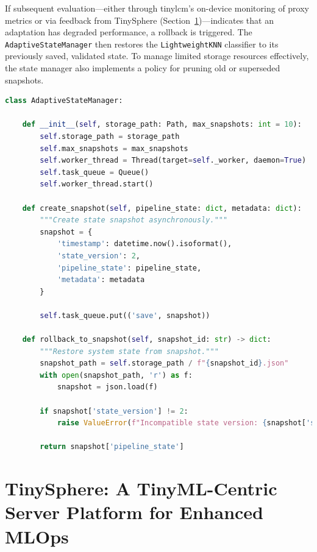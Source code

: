 If subsequent evaluation—either through \gls{tinylcm}'s on-device monitoring of proxy metrics or via feedback from TinySphere (Section~\ref{sec:tinysphere_detailed_design})—indicates that an adaptation has degraded performance, a rollback is triggered. The \texttt{AdaptiveStateManager} then restores the \texttt{LightweightKNN} classifier to its previously saved, validated state. To manage limited storage resources effectively, the state manager also implements a policy for pruning old or superseded snapshots.

\begin{lstlisting}[captionpos=b, language=Python, commentstyle=\color{blue}\itshape, caption={\texttt{AdaptiveStateManager} Implementation Highlights}, label=lst:statemanager]
class AdaptiveStateManager:
    
    def __init__(self, storage_path: Path, max_snapshots: int = 10):
        self.storage_path = storage_path
        self.max_snapshots = max_snapshots
        self.worker_thread = Thread(target=self._worker, daemon=True)
        self.task_queue = Queue()
        self.worker_thread.start()
        
    def create_snapshot(self, pipeline_state: dict, metadata: dict):
        """Create state snapshot asynchronously."""
        snapshot = {
            'timestamp': datetime.now().isoformat(),
            'state_version': 2,
            'pipeline_state': pipeline_state,
            'metadata': metadata
        }
        
        self.task_queue.put(('save', snapshot))
        
    def rollback_to_snapshot(self, snapshot_id: str) -> dict:
        """Restore system state from snapshot."""
        snapshot_path = self.storage_path / f"{snapshot_id}.json"
        with open(snapshot_path, 'r') as f:
            snapshot = json.load(f)
            
        if snapshot['state_version'] != 2:
            raise ValueError(f"Incompatible state version: {snapshot['state_version']}")
            
        return snapshot['pipeline_state']
\end{lstlisting}

\section{TinySphere: A TinyML-Centric Server Platform for Enhanced MLOps}
\label{sec:tinysphere_detailed_design}

